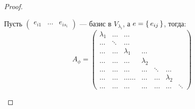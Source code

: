 \begin{proof}
\begin{itemize}
\[      \]
      Пусть $\begin{pmatrix}e_{i1} & \ldots & e_{i s_i} \end{pmatrix}$ --- базис в $V_{\lambda_i}$, а $e = \set{e_{ij}}$, тогда:
      \[
        A_\phi = \begin{pmatrix}\lambda_1 & \ldots & \ldots \\
        \ldots & \ddots & \ldots \\ \ldots & \ldots & \lambda_{1} & \ldots \\ \ldots & \ldots & \ldots & \lambda_{2} \\ \ldots & \ldots & \ldots & \ldots & \ddots & \ldots \\ \ldots & \ldots & \ldots \ldots & \ldots & \ldots & \lambda_{2} \\ \ldots & \ldots & \ldots & \ldots & \ldots & \ldots & \ddots\end{pmatrix}
      \]
  \end{itemize}
\end{proof}
